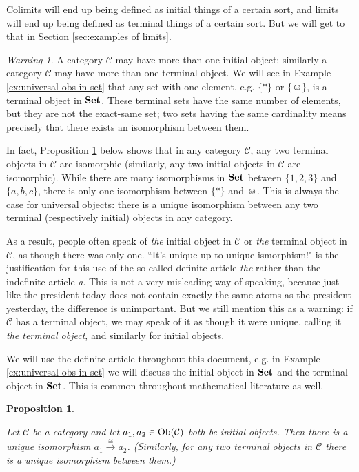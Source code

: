 \documentclass{book}
\def\tn{\textnormal}
\def\mc{\mathcal}
\def\Ob{\tn{Ob}}
\def\singleton{\{\smiley\}}
\def\iso{\cong}
\newcommand{\To}[1]{\xrightarrow{#1}}
\def\Set{{\bf Set}}
\def\mcC{\mc{C}}
\newtheorem{proposition}[subsubsection]{Proposition}
\theoremstyle{remark}
\newtheorem{warning}[subsubsection]{Warning}
\theoremstyle{definition}
\begin{document}
Colimits will end up being defined as initial things of a certain sort, and limits will end up being defined as terminal things of a certain sort. But we will get to that in Section \ref{sec:examples of limits}.

\begin{warning}

A category $\mcC$ may have more than one initial object; similarly a category $\mcC$ may have more than one terminal object. We will see in Example \ref{ex:universal obs in set} that any set with one element, e.g. $\{*\}$ or $\singleton$, is a terminal object in $\Set$. These terminal sets have the same number of elements, but they are not the exact-same set; two sets having the same cardinality means precisely that there exists an isomorphism between them.

In fact, Proposition \ref{prop:initials are isomorphic} below shows that in any category $\mcC$, any two terminal objects in $\mcC$ are isomorphic (similarly, any two initial objects in $\mcC$ are isomorphic). While there are many isomorphisms in $\Set$ between $\{1,2,3\}$ and $\{a,b,c\}$, there is only one isomorphism between $\{*\}$ and $\smiley$. This is always the case for universal objects: there is a unique isomorphism between any two terminal (respectively initial) objects in any category.

As a result, people often speak of {\em the} initial object in $\mcC$ or {\em the} terminal object in $\mcC$, as though there was only one. ``It's unique up to unique ismorphism!" is the justification for this use of the so-called definite article {\em the} rather than the indefinite article {\em a}. This is not a very misleading way of speaking, because just like the president today does not contain exactly the same atoms as the president yesterday, the difference is unimportant. But we still mention this as a warning: if $\mcC$ has a terminal object, we may speak of it as though it were unique, calling it {\em the terminal object}, and similarly for initial objects.

We will use the definite article throughout this document, e.g. in Example \ref{ex:universal obs in set} we will discuss the initial object in $\Set$ and the terminal object in $\Set$. This is common throughout mathematical literature as well.

\end{warning}

\begin{proposition}\label{prop:initials are isomorphic}

Let $\mcC$ be a category and let $a_1,a_2\in\Ob(\mcC)$ both be initial objects. Then there is a unique isomorphism $a_1\To{\iso}a_2$. (Similarly, for any two terminal objects in $\mcC$ there is a unique isomorphism between them.) 

\end{proposition}
\end{document}
